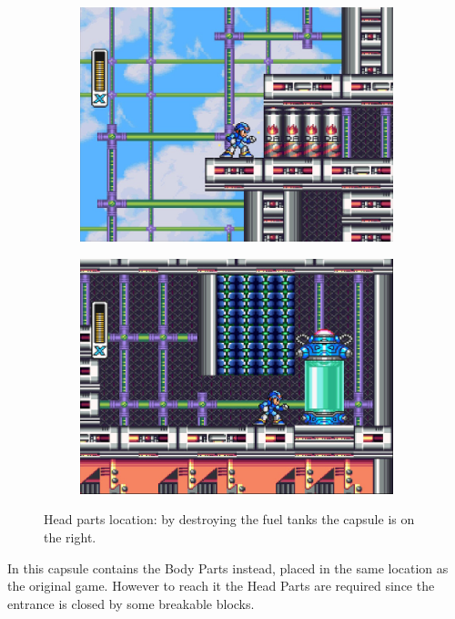  \begin{figure}[htp]
 	\centering
 	\begin{subfigure}{0.4\linewidth}
 		\centering
 		\includegraphics[width=\linewidth]{figures/X1/Storm_eagle/Storm_armor_1.jpg}
 		\caption{}
 	\end{subfigure}
 	\begin{subfigure}{0.4\linewidth}
 		\centering
 		\includegraphics[width=\linewidth]{figures/X1/Storm_eagle/Storm_armor_2.jpg}
 		\caption{}
 	\end{subfigure}
 	\caption{Head parts location: by destroying the fuel tanks the capsule is on the right.}
 \end{figure}
 In \mhx this capsule contains the Body Parts instead, placed in the same location as the original game. However to reach it the Head Parts are required since the entrance is closed by some breakable blocks.
 
